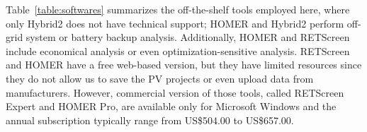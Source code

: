 \documentclass[journal]{IEEEtran}
\begin{document}


Table~\ref{table:softwares} summarizes the off-the-shelf tools employed here, where only Hybrid2 does not have technical support; HOMER and Hybrid2 perform off-grid system or battery backup analysis. %
Additionally, HOMER and RETScreen include economical analysis or even optimization-sensitive analysis. RETScreen and HOMER have a free web-based version, but they have limited resources since they do not allow us to save the PV projects or even upload data from manufacturers. However, commercial version of those tools, called RETScreen Expert and HOMER Pro, are available only for Microsoft Windows and the annual subscription typically range from US\$504.00 to US\$657.00.
\end{document}
